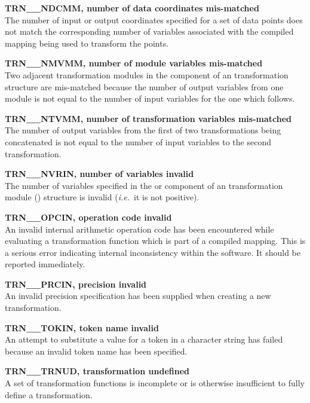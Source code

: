 \begin{description}
\item {\bf TRN\_\_NDCMM, number of data coordinates mis-matched}\\
The number of input or output coordinates specified for a set of data points
does not match the corresponding number of variables associated with the
compiled mapping being used to transform the points.

\item {\bf TRN\_\_NMVMM, number of module variables mis-matched}\\
Two adjacent transformation modules in the  component of
an  transformation structure are mis-matched because the number of
output variables from one module is not equal to the number of input
variables for the one which follows. 

\item {\bf TRN\_\_NTVMM, number of transformation variables mis-matched}\\
The number of output variables from the first of two transformations being
concatenated is not equal to the number of input variables to the second
transformation. 

\item {\bf TRN\_\_NVRIN, number of variables invalid}\\
The number of variables specified in the  or 
component of an  transformation module ()
structure is invalid ({\em i.e.}\ it is not positive). 

\item {\bf TRN\_\_OPCIN, operation code invalid}\\
An invalid internal arithmetic operation code has been encountered while
evaluating a transformation function which is part of a compiled mapping.
This is a serious error indicating internal inconsistency within the
 software. 
It should be reported immediately. 

\item {\bf TRN\_\_PRCIN, precision invalid}\\
An invalid precision specification has been supplied when creating a new
transformation. 

\item {\bf TRN\_\_TOKIN, token name invalid}\\
An attempt to substitute a value for a token in a character string has failed
because an invalid token name has been specified.

\item {\bf TRN\_\_TRNUD, transformation undefined}\\
A set of transformation functions is incomplete or is otherwise insufficient
to fully define a transformation. 


\end{description}
